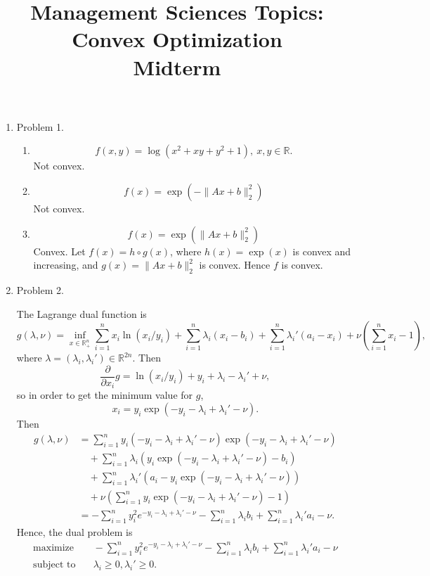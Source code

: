 \documentclass{article}
\begin{document}
\title{Management Sciences Topics: Convex Optimization\\ Midterm }
\date{}

\maketitle

\bigskip

\begin{enumerate}
\item Problem 1. 
\begin{enumerate}
\item 
$$
f(x, y) = \log(x^2+xy+y^2+1), \ x, y\in \mathbb{R}.
$$
Not convex. 

\item 
$$
f(x) = \exp(-\lVert Ax+b\rVert_2^2)
$$
Not convex.

\item
$$
f(x) = \exp(\lVert Ax+b\rVert_2^2)
$$
Convex. Let $f(x) = h\circ g(x)$, where $h(x) = \exp(x)$ is convex and increasing, and $g(x) = \lVert Ax+b\rVert_2^2 $ is convex. Hence $f$ is convex.

\end{enumerate}


\item Problem 2.

The Lagrange dual function is
$$
g(\lambda, \nu) = \inf_{x\in\mathbb{R}_+^n} \sum_{i=1}^{n}x_i\ln(x_i/y_i)+\sum_{i=1}^{n}\lambda_i(x_i-b_i)+\sum_{i=1}^{n}\lambda_i'(a_i-x_i) + \nu (\sum_{i=1}^{n}x_i-1),
$$
where $\lambda = (\lambda_i, \lambda_i') \in \mathbb{R}^{2n} $.
Then 
$$
\frac{\partial}{\partial x_i}g= \ln(x_i/y_i) + y_i + \lambda_i -\lambda_i' + \nu,
$$
so in order to get the minimum value for $g$, 
$$
x_i = y_i\exp(-y_i-\lambda_i+\lambda_i'-\nu).
$$
Then 
$$
\begin{aligned}
g(\lambda, \nu) &= \sum_{i=1}^{n}y_i(-y_i-\lambda_i+\lambda_i'-\nu)\exp(-y_i-\lambda_i+\lambda_i'-\nu) \\
&\quad + \sum_{i=1}^{n}\lambda_i(y_i\exp(-y_i-\lambda_i+\lambda_i'-\nu) - b_i) \\
&\quad + \sum_{i=1}^{n}\lambda_i'(a_i-y_i\exp(-y_i-\lambda_i+\lambda_i'-\nu)) \\
&\quad + \nu(\sum_{i=1}^{n}y_i\exp(-y_i-\lambda_i+\lambda_i'-\nu) - 1) \\
&= -\sum_{i=1}^{n}y_i^2 e^{-y_i-\lambda_i+\lambda_i'-\nu} - \sum_{i=1}^{n}\lambda_i b_i +\sum_{i=1}^{n} \lambda_i'a_i - \nu.
\end{aligned}
$$
Hence, the dual problem is
$$
\begin{aligned}
\text{maximize}&\quad -\sum_{i=1}^{n}y_i^2 e^{-y_i-\lambda_i+\lambda_i'-\nu} - \sum_{i=1}^{n}\lambda_i b_i +\sum_{i=1}^{n} \lambda_i'a_i - \nu \\
\text{subject to}&\quad \lambda_i \ge 0, \lambda_i' \ge 0.
\end{aligned}
$$


\end{enumerate}
\end{document}
